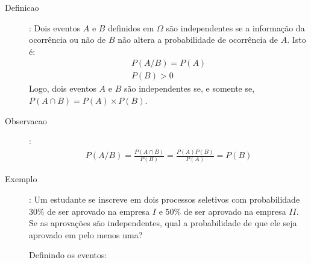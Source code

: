 \documentclass[11pt,a4paper]{book}
\begin{document}
\begin{description}
\begin{enumerate}[leftmargin=*, label=\Roman*., widest=IV, align=left]
\begin{description}
\begin{description}
  \item [Definicao]: Dois eventos $A$ e $B$ definidos em $\Omega$ são independentes se 
 a informação da ocorrência ou não de $B$ não altera a probabilidade de ocorrência
 de $A$. Isto é:
 \begin{align}
   P(A/B)= P(A) \\
   P(B)>0 
 \end{align}
 Logo, dois eventos $A$ e $B$ são independentes se, e somente se, $P(A \cap B)=P(A)\times P(B)$.
\item [Observacao]: 
  \begin{align*}
    P(A/B) = \frac{P(A \cap B)}{P(B)} = \frac{P(A)P(B)}{P(A)}= P(B)
  \end{align*}
\item [Exemplo]: Um estudante se inscreve em dois processos seletivos com probabilidade 
 $30\%$ de ser aprovado na empresa $I$ e $50\%$ de ser aprovado na empresa $II$. Se 
 as aprovações são independentes, qual a probabilidade de que ele seja aprovado em
 pelo menos uma?

 Definindo os eventos:

\end{description}
\end{description}
\end{enumerate}
\end{description}
\end{document}
